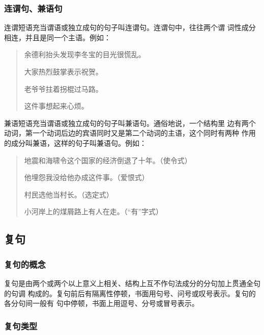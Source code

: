 \documentclass[final,oneside]{ctexbook}
\newenvironment{equotation}{\begin{quotation}\kaishu}{\end{quotation}}
\begin{document}
\subsubsection{连谓句、兼语句}

\begin{description}
  \item[连谓句] 连谓短语充当谓语或独立成句的句子叫连谓句。连谓句中，往往两个谓
    词性成分相连，并且是同一个主语。例如：
    \begin{equotation}
      余德利抬头发现李冬宝的目光很慌乱。

      大家热烈鼓掌表示祝贺。

      老爷爷拄着拐棍过马路。

      这件事想起来心烦。
    \end{equotation}

  \item[兼语句] 兼语短语充当谓语或独立成句的句子叫兼语句。通俗地说，一个结构里
    边有两个动词，第一个动词后边的宾语同时又是第二个动词的主语，这个同时有两种
    作用的成分叫兼语，这样的句子叫兼语句。例如：
    \begin{equotation}
      地震和海啸令这个国家的经济倒退了十年。（使令式）

      他埋怨我没给他办成这件事。（爱恨式）

      村民选他当村长。（选定式）

      小河岸上的煤屑路上有人在走。（“有”字式）
    \end{equotation}

\end{description}

\subsection{复句}

\subsubsection{复句的概念}

复句是由两个或两个以上意义上相关、结构上互不作句法成分的分句加上贯通全句的句调
构成的。复句前后有隔离性停顿，书面用句号、问号或叹号表示。复句的各分句间一般有
句中停顿，书面上用逗号、分号或冒号表示。

\subsubsection{复句类型}
\end{document}
